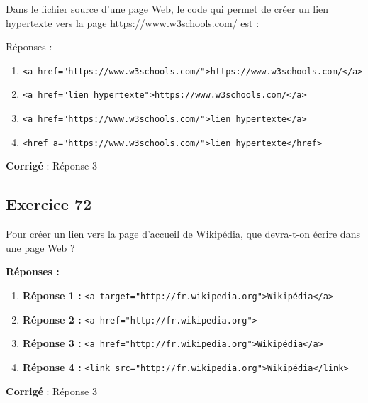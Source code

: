 \documentclass[11pt]{article}
\begin{document}
Dans le fichier source d'une page Web, le code qui permet de créer un
lien hypertexte vers la page \url{https://www.w3schools.com/} est :

Réponses :

\begin{enumerate}
\def\labelenumi{\arabic{enumi}.}
\item
  \texttt{\textless{}a\ href="https://www.w3schools.com/"\textgreater{}https://www.w3schools.com/\textless{}/a\textgreater{}}
\item
  \texttt{\textless{}a\ href="lien\ hypertexte"\textgreater{}https://www.w3schools.com/\textless{}/a\textgreater{}}
\item
  \texttt{\textless{}a\ href="https://www.w3schools.com/"\textgreater{}lien\ hypertexte\textless{}/a\textgreater{}}
\item
  \texttt{\textless{}href\ a="https://www.w3schools.com/"\textgreater{}lien\ hypertexte\textless{}/href\textgreater{}}
\end{enumerate}

    \textbf{Corrigé} : Réponse 3

    \hypertarget{exercice-72}{%
\subsection{Exercice 72}\label{exercice-72}}

Pour créer un lien vers la page d'accueil de Wikipédia, que devra-t-on
écrire dans une page Web ?

\textbf{Réponses :}

\begin{enumerate}
\def\labelenumi{\arabic{enumi}.}
\item
  \textbf{Réponse 1 :}
  \texttt{\textless{}a\ target="http://fr.wikipedia.org"\textgreater{}Wikipédia\textless{}/a\textgreater{}}
\item
  \textbf{Réponse 2 :}
  \texttt{\textless{}a\ href="http://fr.wikipedia.org"\textgreater{}}
\item
  \textbf{Réponse 3 :}
  \texttt{\textless{}a\ href="http://fr.wikipedia.org"\textgreater{}Wikipédia\textless{}/a\textgreater{}}
\item
  \textbf{Réponse 4 :}
  \texttt{\textless{}link\ src="http://fr.wikipedia.org"\textgreater{}Wikipédia\textless{}/link\textgreater{}}
\end{enumerate}

    \textbf{Corrigé} : Réponse 3


    
    
    
    
\end{document}
